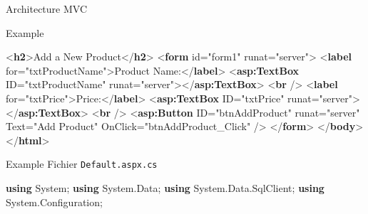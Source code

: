 \documentclass[
  ignorenonframetext,
]{beamer}
\newenvironment{Shaded}{\begin{snugshade}}{\end{snugshade}}
\newcommand{\DataTypeTok}[1]{\textcolor[rgb]{0.68,0.00,0.00}{#1}}
\newcommand{\FunctionTok}[1]{\textcolor[rgb]{0.28,0.35,0.67}{#1}}
\newcommand{\KeywordTok}[1]{\textcolor[rgb]{0.00,0.23,0.31}{\textbf{#1}}}
\newcommand{\NormalTok}[1]{\textcolor[rgb]{0.00,0.23,0.31}{#1}}
\newcommand{\OperatorTok}[1]{\textcolor[rgb]{0.37,0.37,0.37}{#1}}
\newcommand{\OtherTok}[1]{\textcolor[rgb]{0.00,0.23,0.31}{#1}}
\newcommand{\StringTok}[1]{\textcolor[rgb]{0.13,0.47,0.30}{#1}}
\begin{document}
\begin{frame}[fragile]{Architecture MVC}
\begin{block}{Example}
\begin{Shaded}
\begin{Highlighting}[]
    \DataTypeTok{\textless{}}\KeywordTok{h2}\DataTypeTok{\textgreater{}}\NormalTok{Add a New Product}\DataTypeTok{\textless{}/}\KeywordTok{h2}\DataTypeTok{\textgreater{}}
    \DataTypeTok{\textless{}}\KeywordTok{form}\OtherTok{ id}\OperatorTok{=}\StringTok{"form1"}\OtherTok{ runat}\OperatorTok{=}\StringTok{"server"}\DataTypeTok{\textgreater{}}
        \DataTypeTok{\textless{}}\KeywordTok{label}\OtherTok{ for}\OperatorTok{=}\StringTok{"txtProductName"}\DataTypeTok{\textgreater{}}\NormalTok{Product Name:}\DataTypeTok{\textless{}/}\KeywordTok{label}\DataTypeTok{\textgreater{}}
        \DataTypeTok{\textless{}}\KeywordTok{asp:TextBox}\OtherTok{ ID}\OperatorTok{=}\StringTok{"txtProductName"}\OtherTok{ runat}\OperatorTok{=}\StringTok{"server"}\DataTypeTok{\textgreater{}\textless{}/}\KeywordTok{asp:TextBox}\DataTypeTok{\textgreater{}}
        \DataTypeTok{\textless{}}\KeywordTok{br}\OtherTok{ }\DataTypeTok{/\textgreater{}}
        \DataTypeTok{\textless{}}\KeywordTok{label}\OtherTok{ for}\OperatorTok{=}\StringTok{"txtPrice"}\DataTypeTok{\textgreater{}}\NormalTok{Price:}\DataTypeTok{\textless{}/}\KeywordTok{label}\DataTypeTok{\textgreater{}}
        \DataTypeTok{\textless{}}\KeywordTok{asp:TextBox}\OtherTok{ ID}\OperatorTok{=}\StringTok{"txtPrice"}\OtherTok{ runat}\OperatorTok{=}\StringTok{"server"}\DataTypeTok{\textgreater{}\textless{}/}\KeywordTok{asp:TextBox}\DataTypeTok{\textgreater{}}
        \DataTypeTok{\textless{}}\KeywordTok{br}\OtherTok{ }\DataTypeTok{/\textgreater{}}
        \DataTypeTok{\textless{}}\KeywordTok{asp:Button}\OtherTok{ ID}\OperatorTok{=}\StringTok{"btnAddProduct"}\OtherTok{ runat}\OperatorTok{=}\StringTok{"server"}\OtherTok{ Text}\OperatorTok{=}\StringTok{"Add Product"}\OtherTok{ OnClick}\OperatorTok{=}\StringTok{"btnAddProduct\_Click"}\OtherTok{ }\DataTypeTok{/\textgreater{}}
    \DataTypeTok{\textless{}/}\KeywordTok{form}\DataTypeTok{\textgreater{}}
\DataTypeTok{\textless{}/}\KeywordTok{body}\DataTypeTok{\textgreater{}}
\DataTypeTok{\textless{}/}\KeywordTok{html}\DataTypeTok{\textgreater{}}
\end{Highlighting}
\end{Shaded}
\end{block}

\begin{block}{Example}
\label{example-1}
Fichier \texttt{Default.aspx.cs}

\begin{Shaded}
\begin{Highlighting}[]
\KeywordTok{using}\NormalTok{ System}\OperatorTok{;}
\KeywordTok{using}\NormalTok{ System}\OperatorTok{.}\FunctionTok{Data}\OperatorTok{;}
\KeywordTok{using}\NormalTok{ System}\OperatorTok{.}\FunctionTok{Data}\OperatorTok{.}\FunctionTok{SqlClient}\OperatorTok{;}
\KeywordTok{using}\NormalTok{ System}\OperatorTok{.}\FunctionTok{Configuration}\OperatorTok{;}


\end{Highlighting}
\end{Shaded}
\end{block}
\end{frame}
\end{document}
